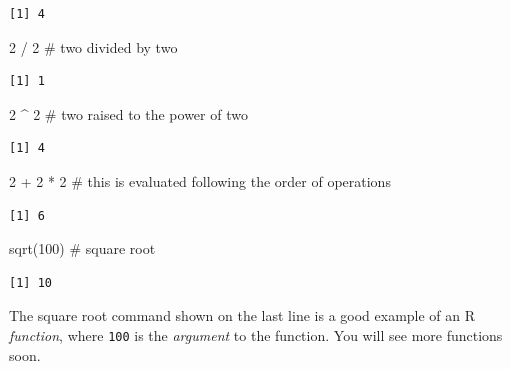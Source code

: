 \documentclass[
  letterpaper,
  DIV=11,
  numbers=noendperiod]{scrreprt}
\newenvironment{Shaded}{\begin{snugshade}}{\end{snugshade}}
\newcommand{\CommentTok}[1]{\textcolor[rgb]{0.37,0.37,0.37}{#1}}
\newcommand{\DecValTok}[1]{\textcolor[rgb]{0.68,0.00,0.00}{#1}}
\newcommand{\FunctionTok}[1]{\textcolor[rgb]{0.28,0.35,0.67}{#1}}
\newcommand{\NormalTok}[1]{\textcolor[rgb]{0.00,0.23,0.31}{#1}}
\newcommand{\SpecialCharTok}[1]{\textcolor[rgb]{0.37,0.37,0.37}{#1}}
\begin{document}
\begin{verbatim}
[1] 4
\end{verbatim}

\begin{Shaded}
\begin{Highlighting}[]
\DecValTok{2} \SpecialCharTok{/} \DecValTok{2} \CommentTok{\# two divided by two}
\end{Highlighting}
\end{Shaded}

\begin{verbatim}
[1] 1
\end{verbatim}

\begin{Shaded}
\begin{Highlighting}[]
\DecValTok{2} \SpecialCharTok{\^{}} \DecValTok{2} \CommentTok{\# two raised to the power of two}
\end{Highlighting}
\end{Shaded}

\begin{verbatim}
[1] 4
\end{verbatim}

\begin{Shaded}
\begin{Highlighting}[]
\DecValTok{2} \SpecialCharTok{+} \DecValTok{2} \SpecialCharTok{*} \DecValTok{2}   \CommentTok{\# this is evaluated following the order of operations}
\end{Highlighting}
\end{Shaded}

\begin{verbatim}
[1] 6
\end{verbatim}

\begin{Shaded}
\begin{Highlighting}[]
\FunctionTok{sqrt}\NormalTok{(}\DecValTok{100}\NormalTok{)   }\CommentTok{\# square root}
\end{Highlighting}
\end{Shaded}

\begin{verbatim}
[1] 10
\end{verbatim}

The square root command shown on the last line is a good example of an R
\emph{function}, where \texttt{100} is the \emph{argument} to the
function. You will see more functions soon.
\end{document}

